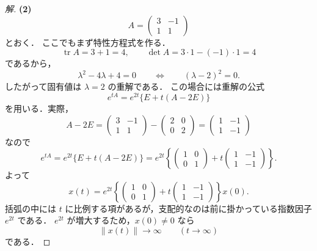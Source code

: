 \documentclass[article,paper=a4paper]{jlreq}
\begin{document}
\begin{proof}[解]
\medskip
\textbf{(2)}
\[
  A=
  \begin{pmatrix}
    3 & -1\\
    1 & 1
  \end{pmatrix}
\]
とおく．
ここでもまず特性方程式を作る．
\[
  \operatorname{tr}A=3+1=4,
  \qquad
  \det A=3\cdot1-(-1)\cdot1=4
\]
であるから，
\[
  \lambda^2-4\lambda+4=0
  \qquad\Longleftrightarrow\qquad
  (\lambda-2)^2=0.
\]
したがって固有値は $\lambda=2$ の重解である．
この場合には重解の公式
\[
  e^{tA}=e^{2t}\{E+t(A-2E)\}
\]
を用いる．実際，
\[
  A-2E=
  \begin{pmatrix}
    3 & -1\\
    1 & 1
  \end{pmatrix}
  -
  \begin{pmatrix}
    2 & 0\\
    0 & 2
  \end{pmatrix}
  =
  \begin{pmatrix}
    1 & -1\\
    1 & -1
  \end{pmatrix}
\]
なので
\[
  e^{tA}
    =
    e^{2t}\{E+t(A-2E)\}
    =
    e^{2t}
    \left\{
      \begin{pmatrix}
        1 & 0\\
        0 & 1
      \end{pmatrix}
      +
      t
      \begin{pmatrix}
        1 & -1\\
        1 & -1
      \end{pmatrix}
    \right\}.
\]
よって
\[
  x(t)
    =
    e^{2t}
    \left\{
      \begin{pmatrix}
        1 & 0\\
        0 & 1
      \end{pmatrix}
      +
      t
      \begin{pmatrix}
        1 & -1\\
        1 & -1
      \end{pmatrix}
    \right\}x(0).
\]
括弧の中には $t$ に比例する項があるが，支配的なのは前に掛かっている指数因子 $e^{2t}$ である．
$e^{2t}$ が増大するため，$x(0)\ne0$ なら
\[
  \|x(t)\|\to\infty
  \qquad (t\to\infty)
\]
である．


\end{proof}
\end{document}
